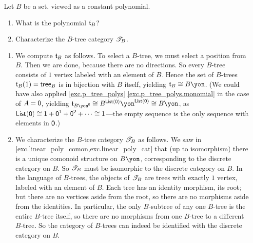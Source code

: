 \documentclass[Book-Poly]{subfiles}
\begin{document}
\begin{exercise}
Let $B$ be a set, viewed as a constant polynomial.
\begin{enumerate}
	\item What is the polynomial $\mathfrak{t}_B$? 
	\item Characterize the $B$-tree category $\mathscr{T}_{B}$.
\qedhere
\end{enumerate}
\begin{solution}
\begin{enumerate}
    \item We compute $\mathfrak{t}_B$ as follows.
    To select a $B$-tree, we must select a position from $B$.
    Then we are done, because there are no directions.
    So every $B$-tree consists of $1$ vertex labeled with an element of $B$.
    Hence the set of $B$-trees $\mathfrak{t}_B(\textsf{1})=\mathsf{tree}_B$ is in bijection with $B$ itself, yielding $\car{t}_B\iso B\yon$.
    (We could have also applied \cref{exc.p_tree_polys} \cref{exc.p_tree_polys.monomial} in the case of $A=\textsf{0}$, yielding $\car{t}_{B\yon^\0}\iso B^{\lst(\0)}\yon^{\lst(\0)}\iso B\yon$, as $\mathsf{List}(\textsf{0})\cong\textsf{1}+\textsf{0}^{\textsf{1}}+\textsf{0}^{\textsf{2}}+\cdots\cong\textsf{1}$---the empty sequence is the only sequence with elements in $\textsf{0}$.)
    \item We characterize the $B$-tree category $\mathscr{T}_{B}$ as follows.
    We saw in \cref{exc.linear_poly_comon,exc.linear_poly_cat} that (up to isomorphism) there is a unique comonoid structure on $B\yon$, corresponding to the discrete category on $B$.
    So $\mathscr{T}_{B}$ must be isomorphic to the discrete category on $B$.
    In the language of $B$-trees, the objects of $\mathscr{T}_{B}$ are trees with exactly $1$ vertex, labeled with an element of $B$.
    Each tree has an identity morphism, its root; but there are no vertices aside from the root, so there are no morphisms aside from the identities.
    In particular, the only $B$-subtree of any one $B$-tree is the entire $B$-tree itself, so there are no morphisms from one $B$-tree to a different $B$-tree.
    So the category of $B$-trees can indeed be identified with the discrete category on $B$.
\end{enumerate}
\end{solution}
\end{exercise}
\end{document}

